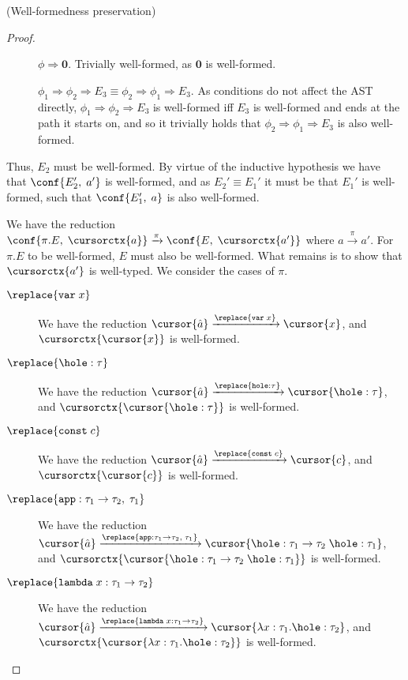 \begin{lemma}{(Well-formedness preservation)}
\begin{proof}
\begin{description}
\begin{description}
%
\item[] $\phi \Rightarrow \mathbf{0}$. Trivially well-formed, as $\mathbf{0}$ is well-formed.
%
\item[] $\phi_1 \Rightarrow \phi_2 \Rightarrow E_3 \equiv \phi_2 \Rightarrow \phi_1 \Rightarrow E_3$. As conditions do not affect the AST directly, $\phi_1 \Rightarrow \phi_2 \Rightarrow E_3$ is well-formed iff $E_3$ is well-formed and ends at the path it starts on, and so it trivially holds that $\phi_2 \Rightarrow \phi_1 \Rightarrow E_3$ is also well-formed.
%
\end{description}
%
Thus, $E_2$ must be well-formed. By virtue of the inductive hypothesis we have that $\conf{E_2',\; a'}$ is well-formed, and as $E_2' \equiv E_1'$ it must be that $E_1'$ is well-formed, such that $\conf{E_1',\; a}$ is also well-formed.
%
\item[\runa{context}] We have the reduction $\conf{\pi.E,\; \cursorctx{a}} \xrightarrow{\pi} \conf{E,\; \cursorctx{a'}}$ where $a \xrightarrow{\pi} a'$. For $\pi.E$ to be well-formed, $E$ must also be well-formed. What remains is to show that $\cursorctx{a'}$ is well-typed. We consider the cases of $\pi$.
%
\begin{description}
\item[$\replace{\texttt{var}\; x}$] We have the reduction $\cursor{\hat{a}} \xrightarrow{\replace{\texttt{var}\; x}} \cursor{x}$, and $\cursorctx{\cursor{x}}$ is well-formed.
%
\item[$\replace{\hole : \tau}$] We have the reduction $\cursor{\hat{a}} \xrightarrow{\replace{\texttt{hole} : \tau}} \cursor{\hole : \tau}$, and $\cursorctx{\cursor{\hole : \tau}}$ is well-formed.
%
\item[$\replace{\texttt{const}\; c}$] We have the reduction $\cursor{\hat{a}} \xrightarrow{\replace{\texttt{const}\; c}} \cursor{c}$, and $\cursorctx{\cursor{c}}$ is well-formed.
%
\item[$\replace{\texttt{app} : \tau_1 \rightarrow \tau_2,\; \tau_1}$] We have the reduction $\cursor{\hat{a}} \xrightarrow{\replace{\texttt{app} : \tau_1 \rightarrow \tau_2,\; \tau_1}} \cursor{\hole : \tau_1 \rightarrow \tau_2\; \hole : \tau_1}$, and $\cursorctx{\cursor{\hole : \tau_1 \rightarrow \tau_2\; \hole : \tau_1}}$ is well-formed.
%
\item[$\replace{\texttt{lambda}\; x : \tau_1 \rightarrow \tau_2}$] We have the reduction $\cursor{\hat{a}} \xrightarrow{\replace{\texttt{lambda}\; x : \tau_1 \rightarrow \tau_2}} \cursor{\lambda x : \tau_1.\hole : \tau_2}$, and $\cursorctx{\cursor{\lambda x : \tau_1.\hole : \tau_2}}$ is well-formed.

\end{description}
\end{description}
\end{proof}
\end{lemma}
